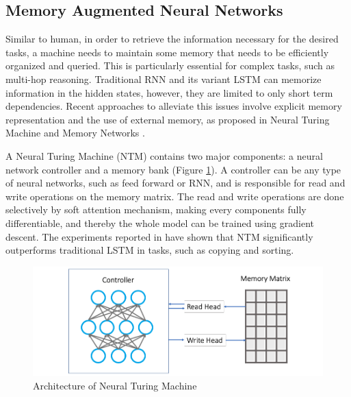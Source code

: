 \documentclass[journal]{IEEEtran}
\begin{document}
\subsection{Memory Augmented Neural Networks}
Similar to human, in order to retrieve the information necessary for the desired tasks, a machine needs to maintain some memory that needs to be efficiently organized and queried. 
This is particularly essential for complex tasks, such as multi-hop reasoning. Traditional RNN and its variant LSTM can memorize information in the hidden states,
however, they are limited to only short term dependencies. Recent approaches to alleviate this issues involve explicit memory representation and the use of external memory, 
as proposed in Neural Turing Machine \cite{graves2014neural} and Memory Networks \cite{weston2014memory}. 

A Neural Turing Machine (NTM) contains two major components: a neural network controller and a memory bank (Figure \ref{NTM}). 
A controller can be any type of neural networks, such as feed forward or RNN, and is responsible for read and write operations on the memory matrix.
The read and write operations are done selectively by soft attention mechanism, making every components fully differentiable, 
and thereby the whole model can be trained using gradient descent. The experiments reported in \cite{graves2014neural} have shown that NTM significantly
outperforms traditional LSTM in tasks, such as copying and sorting.

\begin{figure}[htb]
  \centering
  \includegraphics[width=0.8\columnwidth]{NTM.png}
  \caption{Architecture of Neural Turing Machine}
  \label{NTM}
\end{figure}
\end{document}
